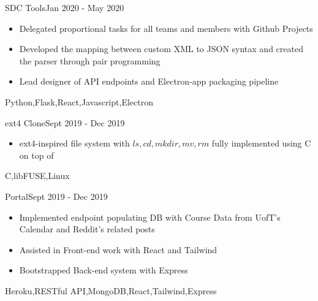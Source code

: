 %
%
%


\begin{projects}
	\project
	{SDC Tools}{Jan 2020 - May 2020}
	{}
	{\begin{itemize}
        \item{Delegated proportional tasks for all teams and members with Github Projects}
        \item{Developed the mapping between custom XML to JSON syntax and created the parser through pair programming}
        \item{Lead designer of API endpoints and Electron-app packaging pipeline}
      \end{itemize}
    }
	{Python,Flask,React,Javascript,Electron}

    \project
	{ext4 Clone}{Sept 2019 - Dec 2019}
	{}
	{\begin{itemize}
        \item{ext4-inspired file system with $ls,cd,mkdir,mv,rm$ fully implemented using C on top of }
      \end{itemize}   
    }
	{C,libFUSE,Linux}
				
	\project
	{Portal}{Sept 2019 - Dec 2019}
	{ }
	{\begin{itemize}
        \item{Implemented endpoint populating DB with Course Data from UofT's Calendar and Reddit's related posts}
        \item{Assisted in Front-end work with React and Tailwind}
        \item{Bootstrapped Back-end system with Express}
      \end{itemize}
    }
	{Heroku,RESTful API,MongoDB,React,Tailwind,Express}

\end{projects}
